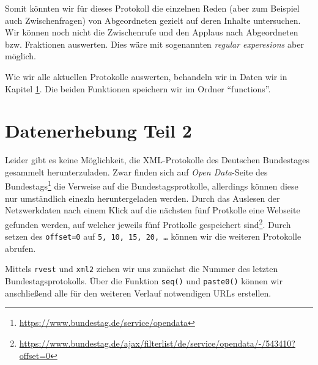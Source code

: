 \documentclass[oneside, 12pt]{scrbook}
\newenvironment{Shaded}{\begin{snugshade}}{\end{snugshade}}
\newcommand{\CharTok}[1]{\textcolor[rgb]{0.31,0.60,0.02}{#1}}
\newcommand{\DataTypeTok}[1]{\textcolor[rgb]{0.13,0.29,0.53}{#1}}
\newcommand{\DecValTok}[1]{\textcolor[rgb]{0.00,0.00,0.81}{#1}}
\newcommand{\KeywordTok}[1]{\textcolor[rgb]{0.13,0.29,0.53}{\textbf{#1}}}
\newcommand{\NormalTok}[1]{#1}
\newcommand{\OperatorTok}[1]{\textcolor[rgb]{0.81,0.36,0.00}{\textbf{#1}}}
\newcommand{\OtherTok}[1]{\textcolor[rgb]{0.56,0.35,0.01}{#1}}
\newcommand{\StringTok}[1]{\textcolor[rgb]{0.31,0.60,0.02}{#1}}
\theoremstyle{definition}
\theoremstyle{definition}
\theoremstyle{definition}
\theoremstyle{remark}
\begin{document}
Somit könnten wir für dieses Protokoll die einzelnen Reden (aber zum
Beispiel auch Zwischenfragen) von Abgeordneten gezielt auf deren Inhalte
untersuchen. Wir können noch nicht die Zwischenrufe und den Applaus nach
Abgeordneten bzw. Fraktionen auswerten. Dies wäre mit sogenannten
\emph{regular experesions} aber möglich.

Wie wir alle aktuellen Protokolle auswerten, behandeln wir in Daten wir
in Kapitel \ref{data-02}. Die beiden Funktionen speichern wir im Ordner
``functions''.

\hypertarget{data-02}{%
\chapter{Datenerhebung Teil 2}\label{data-02}}

Leider gibt es keine Möglichkeit, die XML-Protokolle des Deutschen
Bundestages gesammelt herunterzuladen. Zwar finden sich auf \emph{Open
Data}-Seite des Bundestags\footnote{\url{https://www.bundestag.de/service/opendata}}
die Verweise auf die Bundestagsprotkolle, allerdings können diese nur
umständlich einezln heruntergeladen werden. Durch das Auslesen der
Netzwerkdaten nach einem Klick auf die nächsten fünf Protkolle eine
Webseite gefunden werden, auf welcher jeweils fünf Protkolle gespeichert
sind\footnote{\url{https://www.bundestag.de/ajax/filterlist/de/service/opendata/-/543410?offset=0}}.
Durch setzen des \texttt{offset=0} auf
\texttt{5,\ 10,\ 15,\ 20,\ \ldots{}} können wir die weiteren Protokolle
abrufen.

Mittels \texttt{rvest} und \texttt{xml2} ziehen wir uns zunächst die
Nummer des letzten Bundestagsprotokolls. Über die Funktion
\texttt{seq()} und \texttt{paste0()} können wir anschließend alle für
den weiteren Verlauf notwendigen URLs erstellen.

\begin{Shaded}
\end{Shaded}
\end{document}

